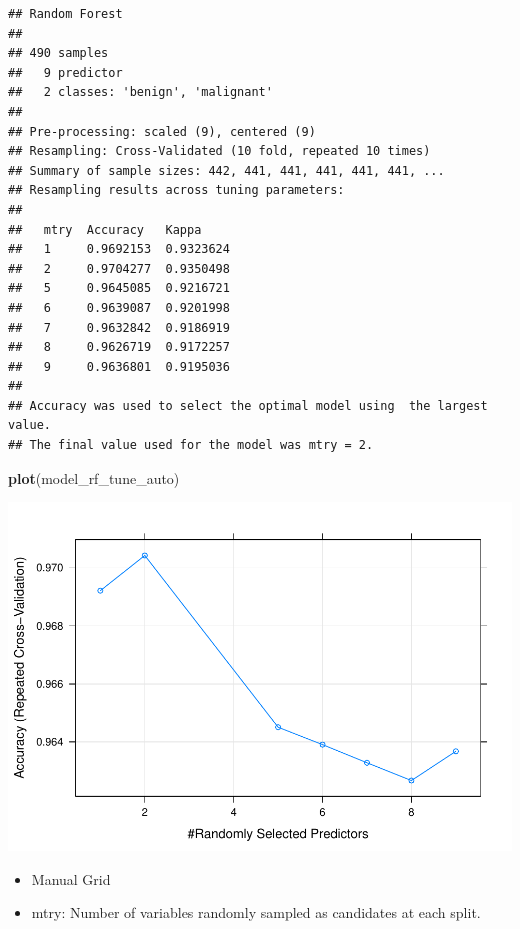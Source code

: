 \documentclass[]{article}
\newenvironment{Shaded}{\begin{snugshade}}{\end{snugshade}}
\newcommand{\KeywordTok}[1]{\textcolor[rgb]{0.13,0.29,0.53}{\textbf{{#1}}}}
\newcommand{\NormalTok}[1]{{#1}}
\begin{document}
\begin{verbatim}
## Random Forest 
## 
## 490 samples
##   9 predictor
##   2 classes: 'benign', 'malignant' 
## 
## Pre-processing: scaled (9), centered (9) 
## Resampling: Cross-Validated (10 fold, repeated 10 times) 
## Summary of sample sizes: 442, 441, 441, 441, 441, 441, ... 
## Resampling results across tuning parameters:
## 
##   mtry  Accuracy   Kappa    
##   1     0.9692153  0.9323624
##   2     0.9704277  0.9350498
##   5     0.9645085  0.9216721
##   6     0.9639087  0.9201998
##   7     0.9632842  0.9186919
##   8     0.9626719  0.9172257
##   9     0.9636801  0.9195036
## 
## Accuracy was used to select the optimal model using  the largest value.
## The final value used for the model was mtry = 2.
\end{verbatim}

\begin{Shaded}
\begin{Highlighting}[]
\KeywordTok{plot}\NormalTok{(model_rf_tune_auto)}
\end{Highlighting}
\end{Shaded}

\includegraphics{webinar_code_files/figure-latex/unnamed-chunk-37-1.pdf}

\begin{itemize}
\item
  Manual Grid
\item
  mtry: Number of variables randomly sampled as candidates at each
  split.
\end{itemize}
\end{document}
